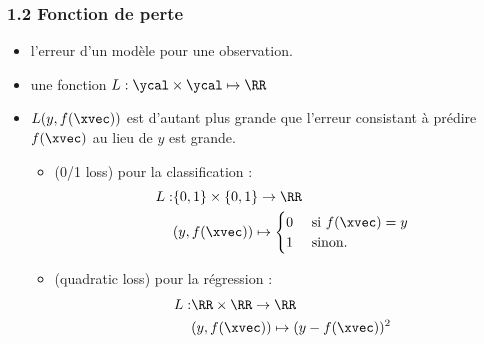\begin{frame}
  \frametitle{1.2 Fonction de perte}
  \begin{itemize}
  \item {} l'erreur d'un modèle pour une observation.
  \item {} une fonction
    $L : \ycal \times \ycal \mapsto \RR$ 
  \item[] $L(y, f(\xvec))$ est d'autant plus grande que l'erreur consistant à
    prédire $f(\xvec)$ au lieu de $y$ est grande.
    \pause
    \begin{itemize}
    \item {} \textcolor{gray!70}{(0/1 loss)} pour la classification :
      \begin{eqnarray*}
        L : & \{0, 1\} \times \{0, 1\} \rightarrow \RR \\ \nonumber
            & (y, f(\xvec)) \mapsto
              \begin{cases}
                0 & \text{ si } f(\xvec) = y \\ \nonumber
                1 & \text{ sinon.}
              \end{cases}                
      \end{eqnarray*}
      \pause
    \item {} \textcolor{gray!70}{(quadratic loss)} pour la régression :
      \begin{eqnarray*}
        L : & \RR \times \RR \rightarrow \RR \\ \nonumber
            & (y, f(\xvec)) \mapsto (y - f(\xvec))^2
      \end{eqnarray*}      
    \end{itemize}
  \end{itemize}
\end{frame}


